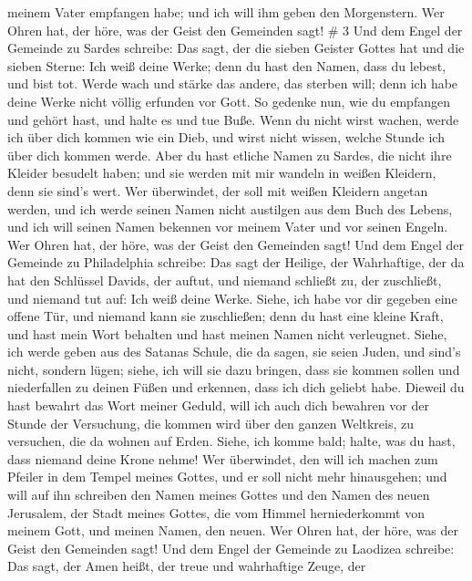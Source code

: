 meinem Vater empfangen habe; und ich will ihm geben den Morgenstern.
 Wer Ohren hat, der höre, was der Geist den Gemeinden sagt!
\# 3  Und dem Engel der Gemeinde zu Sardes schreibe: Das
sagt, der die sieben Geister Gottes hat und die sieben Sterne: Ich weiß
deine Werke; denn du hast den Namen, dass du lebest, und bist tot.
 Werde wach und stärke das andere, das sterben will; denn
ich habe deine Werke nicht völlig erfunden vor Gott.  So
gedenke nun, wie du empfangen und gehört hast, und halte es und tue
Buße. Wenn du nicht wirst wachen, werde ich über dich kommen wie ein
Dieb, und wirst nicht wissen, welche Stunde ich über dich kommen werde.
 Aber du hast etliche Namen zu Sardes, die nicht ihre
Kleider besudelt haben; und sie werden mit mir wandeln in weißen
Kleidern, denn sie sind's wert.  Wer überwindet, der soll
mit weißen Kleidern angetan werden, und ich werde seinen Namen nicht
austilgen aus dem Buch des Lebens, und ich will seinen Namen bekennen
vor meinem Vater und vor seinen Engeln.  Wer Ohren hat, der
höre, was der Geist den Gemeinden sagt!  Und dem Engel der
Gemeinde zu Philadelphia schreibe: Das sagt der Heilige, der
Wahrhaftige, der da hat den Schlüssel Davids, der auftut, und niemand
schließt zu, der zuschließt, und niemand tut auf:  Ich weiß
deine Werke. Siehe, ich habe vor dir gegeben eine offene Tür, und
niemand kann sie zuschließen; denn du hast eine kleine Kraft, und hast
mein Wort behalten und hast meinen Namen nicht verleugnet. 
Siehe, ich werde geben aus des Satanas Schule, die da sagen, sie seien
Juden, und sind's nicht, sondern lügen; siehe, ich will sie dazu
bringen, dass sie kommen sollen und niederfallen zu deinen Füßen und
erkennen, dass ich dich geliebt habe.  Dieweil du hast
bewahrt das Wort meiner Geduld, will ich auch dich bewahren vor der
Stunde der Versuchung, die kommen wird über den ganzen Weltkreis, zu
versuchen, die da wohnen auf Erden.  Siehe, ich komme bald;
halte, was du hast, dass niemand deine Krone nehme!  Wer
überwindet, den will ich machen zum Pfeiler in dem Tempel meines Gottes,
und er soll nicht mehr hinausgehen; und will auf ihn schreiben den Namen
meines Gottes und den Namen des neuen Jerusalem, der Stadt meines
Gottes, die vom Himmel herniederkommt von meinem Gott, und meinen Namen,
den neuen.  Wer Ohren hat, der höre, was der Geist den
Gemeinden sagt!  Und dem Engel der Gemeinde zu Laodizea
schreibe: Das sagt, der Amen heißt, der treue und wahrhaftige Zeuge, der
